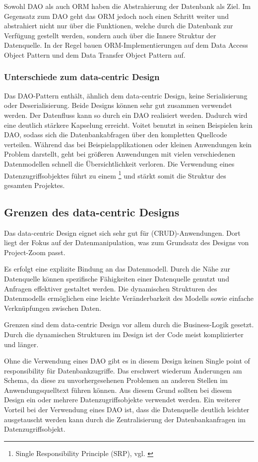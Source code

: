 Sowohl DAO als auch ORM haben die Abstrahierung der Datenbank als Ziel. Im Gegensatz zum DAO geht das ORM jedoch noch einen Schritt weiter und abstrahiert nicht nur über die Funktionen, welche durch die Datenbank zur Verfügung gestellt werden, sondern auch über die Innere Struktur der Datenquelle. In der Regel bauen ORM-Implementierungen auf dem Data Access Object Pattern und dem Data Transfer Object Pattern auf.

\subsubsection{Unterschiede zum data-centric Design}
Das DAO-Pattern enthält, ähnlich dem data-centric Design, keine Serialisierung oder Deserialisierung. Beide Designs können sehr gut zusammen verwendet werden. Der Datenfluss kann so durch ein DAO realisiert werden. Dadurch wird eine deutlich stärkere Kapselung erreicht. Voitet benutzt in seinen Beispielen kein DAO, sodass sich die Datenbankabfragen über den kompletten Quellcode verteilen. Während das bei Beispielapplikationen oder kleinen Anwendungen kein Problem darstellt, geht bei größeren Anwendungen mit vielen verschiedenen Datenmodellen schnell die Übersichtlichkeit verloren. Die Verwendung eines Datenzugriffsobjektes führt zu einem \footnote{ Single Responsibility Principle (SRP), vgl. \cite[p.~339]{design-patterns}}
 und stärkt somit die Struktur des gesamten Projektes. 

\subsection{Grenzen des data-centric Designs}
Das data-centric Design eignet sich sehr gut für  (CRUD)-Anwendungen. Dort liegt der Fokus auf der Datenmanipulation, was zum Grundsatz des Designs von Project-Zoom passt.

Es erfolgt eine explizite Bindung an das Datenmodell. Durch die Nähe zur Datenquelle können spezifische Fähigkeiten einer Datenquelle genutzt und Anfragen effektiver gestaltet werden. Die dynamischen Strukturen des Datenmodells ermöglichen eine leichte Veränderbarkeit des Modells sowie einfache Verknüpfungen zwischen Daten.

Grenzen sind dem data-centric Design vor allem durch die Business-Logik gesetzt. Durch die dynamischen Strukturen im Design ist der Code meist komplizierter und länger.

Ohne die Verwendung eines DAO gibt es in diesem Design keinen Single point of responsibility für Datenbankzugriffe. Das erschwert wiederum Änderungen am Schema, da diese zu unvorhergesehenen Problemen an anderen Stellen im Anwendungsquelltext führen können. Aus diesem Grund sollten bei diesem Design ein oder mehrere Datenzugriffsobjekte verwendet werden. Ein weiterer Vorteil bei der Verwendung eines DAO ist, dass die Datenquelle deutlich leichter ausgetauscht werden kann durch die Zentralisierung der Datenbankanfragen im Datenzugriffsobjekt.

